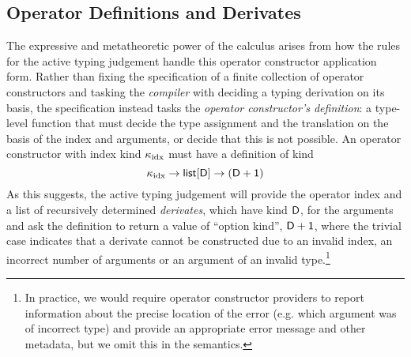 \subsection{Operator Definitions and Derivates}
The expressive and metatheoretic power of the calculus arises from how the rules for the active typing judgement handle this  operator constructor application form. Rather than fixing the specification of a finite collection of operator constructors and tasking the \emph{compiler} with deciding a typing derivation on its basis, the specification instead tasks the \emph{operator constructor's definition}: {a type-level function that must decide the type assignment and the translation on the basis of the index and arguments, or decide that this is not possible}. An operator constructor with index kind $\kappa_{\text{idx}}$ must have a definition of kind \[\kappa_{\text{idx}} \rightarrow \textsf{list}[\textsf{D}] \rightarrow (\textsf{D} + \textsf{1})\] 
As this suggests, the active typing judgement  will provide the operator index and a list of {recursively determined \emph{derivates}}, which have kind $\textsf{D}$, for the arguments and ask the definition to return a value of ``option kind'', $\textsf{D} + \textsf{1}$, where the trivial case indicates that a derivate cannot be constructed due to an invalid index, an incorrect number of arguments or an argument of an invalid type.\footnote{In practice, we would require operator constructor providers to report information about the precise location of the error (e.g. which argument was of incorrect type) and provide an appropriate error message and other metadata, but we omit this in the semantics.}
